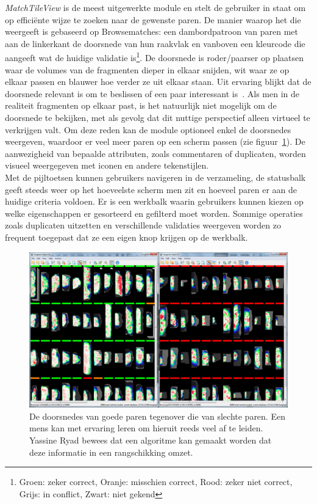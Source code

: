 \emph{MatchTileView} is de meest uitgewerkte module en stelt de gebruiker in staat om op effici\"ente wijze te zoeken naar de gewenste paren. De manier waarop het die weergeeft is gebaseerd op Browsematches: een dambordpatroon van paren met aan de linkerkant de doorsnede van hun raakvlak en vanboven een kleurcode die aangeeft wat de huidige validatie is\footnote{Groen: zeker correct, Oranje: misschien correct, Rood: zeker niet correct, Grijs: in conflict, Zwart: niet gekend}. De doorsnede is roder/paarser op plaatsen waar de volumes van de fragmenten dieper in elkaar snijden, wit waar ze op elkaar passen en blauwer hoe verder ze uit elkaar staan. Uit ervaring blijkt dat de doorsnede relevant is om te beslissen of een paar interessant is~\cite{Brown2010}. Als men in de realiteit fragmenten op elkaar past, is het natuurlijk niet mogelijk om de doorsnede te bekijken, met als gevolg dat dit nuttige perspectief alleen virtueel te verkrijgen valt. Om deze reden kan de module optioneel enkel de doorsnedes weergeven, waardoor er veel meer paren op een scherm passen (zie figuur~\ref{fig:tileview-reduced-compare}). De aanwezigheid van bepaalde attributen, zoals commentaren of duplicaten, worden visueel weergegeven met iconen en andere tekenstijlen.\\

Met de pijltoetsen kunnen gebruikers navigeren in de verzameling, de statusbalk geeft steeds weer op het hoeveelste scherm men zit en hoeveel paren er aan de huidige criteria voldoen. Er is een werkbalk waarin gebruikers kunnen kiezen op welke eigenschappen er gesorteerd en gefilterd moet worden. Sommige operaties zoals duplicaten uitzetten en verschillende validaties weergeven worden zo frequent toegepast dat ze een eigen knop krijgen op de werkbalk.\\

\begin{figure}[ht]
	\begin{center}
		\includegraphics[width=1.0\columnwidth]{images/tileview-reduced-compare-01.png}
		\caption{De doorsnedes van goede paren tegenover die van slechte paren. Een mens kan met ervaring leren om hieruit reeds veel af te leiden. Yassine Ryad bewees dat een algoritme kan gemaakt worden dat deze informatie in een rangschikking omzet.~\cite{Ryad2011}}
		\label{fig:tileview-reduced-compare}
	\end{center}
\end{figure}

